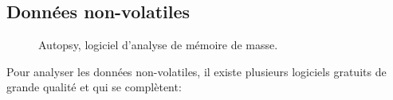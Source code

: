 \subsection{Données non-volatiles}


\begin{figure}
    \centering
    \caption{Autopsy, logiciel d'analyse de mémoire de masse.}
    \label{fig:autopsy-overview}
\end{figure}

Pour analyser les données non-volatiles, il existe plusieurs logiciels gratuits de grande qualité et qui se complètent:

